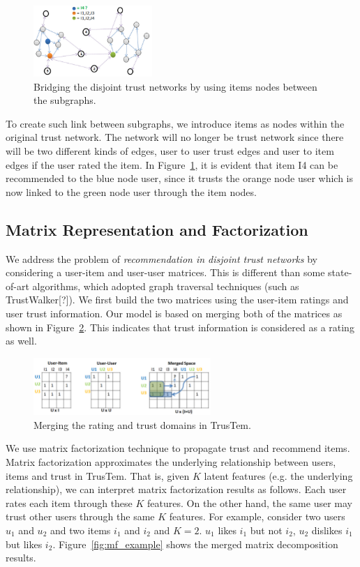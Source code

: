\documentclass[11pt, conference, onecolumn]{IEEEtran}
\begin{document}
\begin{figure}[tp]
\centering
\includegraphics[width=0.4\textwidth]{fig2}
\caption{Bridging the disjoint trust networks by using items nodes between the subgraphs.}
\label{fig:link}
\end{figure}

To create such link between subgraphs, we introduce items as nodes within the original trust network. The network will no longer be trust network since there will be two different kinds of edges, user to user trust edges and user to item edges if the user rated the item. In Figure~\ref{fig:link}, it is evident that item I4 can be recommended to the blue node user, since it trusts the orange node user which is now linked to the green node user through the item nodes. 

\subsection{Matrix Representation and Factorization}
We address the problem of \textit{recommendation in disjoint trust networks} by considering a user-item and user-user matrices. This is different than some state-of-art algorithms, which adopted graph traversal techniques (such as TrustWalker[?]). We first build the two matrices using the user-item ratings and user trust information. Our model is based on merging both of the matrices as shown in Figure~\ref{fig:merge}. This indicates that trust information is considered as a rating as well.

\begin{figure}[tp]
\centering
\includegraphics[width=0.6\textwidth]{fig3}
\caption{Merging the rating and trust domains in TrusTem.}
\label{fig:merge}
\end{figure}

We use matrix factorization technique to propagate trust and recommend items. Matrix factorization approximates the underlying relationship between users, items and trust in TrusTem. That is, given $K$ latent features (e.g. the underlying relationship), we can interpret matrix factorization results as follows. Each user  rates each item through these $K$ features. On the other hand, the same user may trust other users through the same $K$ features. For example, consider two users $u_1$ and $u_2$ and two items $i_1$ and $i_2$ and $K=2$. $u_1$ likes $i_1$ but not $i_2$, $u_2$ dislikes $i_1$ but likes $i_2$. Figure~\ref{fig:mf_example} shows the  merged matrix decomposition results.
 
\end{document}
